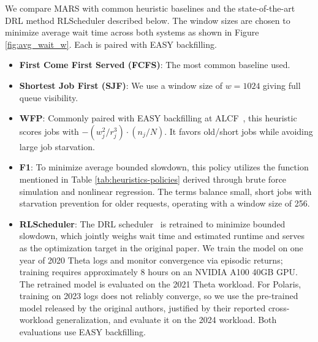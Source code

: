 \documentclass[conference]{IEEEtran}
\begin{document}

We compare MARS with common heuristic baselines and the state-of-the-art DRL method RLScheduler described below. The window sizes are chosen to minimize average wait time across both systems as shown in Figure \ref{fig:avg_wait_w}. Each is paired with EASY backfilling.

 \begin{itemize}
     \item \textbf{First Come First Served (FCFS)}: The most common baseline used.
     \item \textbf{Shortest Job First (SJF)}: We use a window size of $w=1024$ giving full queue visibility.
     \item \textbf{WFP}: Commonly paired with EASY backfilling at ALCF~\cite{allcock_expatanl_2018, tang-cluster09}, this heuristic scores jobs with $-(w_j^2 / r_j^3) \cdot (n_j / N)$. It favors old/short jobs while avoiding large job starvation.
     \item \textbf{F1}: To minimize average bounded slowdown, this policy utilizes the function mentioned in Table \ref{tab:heuristics-policies} derived through brute force simulation and nonlinear regression. The terms balance small, short jobs with starvation prevention for older requests, operating with a window size of 256.
     \item \textbf{RLScheduler}: The DRL scheduler~\cite{zhang_rlscheduler_2020} is retrained to minimize bounded slowdown, which jointly weighs wait time and estimated runtime and serves as the optimization target in the original paper. We train the model on one year of 2020 Theta logs and monitor convergence via episodic returns; training requires approximately 8 hours on an NVIDIA A100 40GB GPU. The retrained model is evaluated on the 2021 Theta workload. For Polaris, training on 2023 logs does not reliably converge, so we use the pre-trained model released by the original authors, justified by their reported cross-workload generalization, and evaluate it on the 2024 workload. Both evaluations use EASY backfilling. 
     

\end{itemize}
\end{document}
